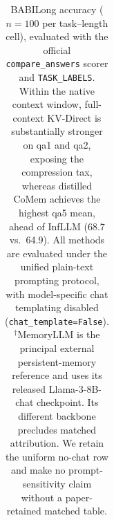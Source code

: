 \begin{table}[!htbp]
{\begin{tabular}{@{}llrrrrrrrr@{}}
\bottomrule
\end{tabular}%
}
\caption{BABILong accuracy ($n{=}100$ per task--length cell), evaluated with
the official \texttt{compare\_answers} scorer and \texttt{TASK\_LABELS}.
Within the native context window, full-context KV-Direct is substantially
stronger on qa1 and qa2, exposing the compression tax, whereas distilled CoMem
achieves the highest qa5 mean, ahead of InfLLM (68.7 vs.\ 64.9).
All methods are evaluated under the unified plain-text prompting protocol,
with model-specific chat templating disabled
(\texttt{chat\_template=False}).
$^{\dagger}$MemoryLLM is the principal external persistent-memory reference and
uses its released Llama-3-8B-chat checkpoint. Its different backbone precludes
matched attribution. We retain the uniform no-chat row and make no
prompt-sensitivity claim without a paper-retained matched table.}
\label{tab:babilong}
\end{table}
